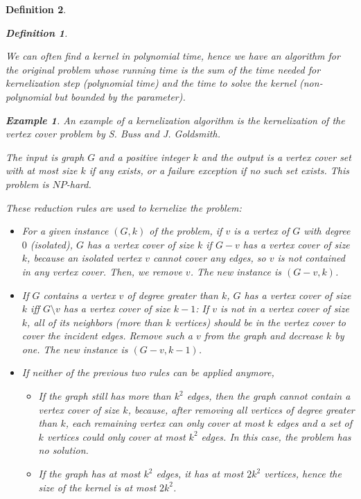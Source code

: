 \documentclass[12pt]{article}
\theoremstyle{slplain}
\newtheorem{defi}{Definition}
\newtheorem{exam}{Example}
\begin{document}
\begin{defi}
\begin{defi}
\end{defi}




We can often find a kernel in polynomial time, hence we have an algorithm for the original problem whose running time is the sum of the time needed for kernelization step (polynomial time) and the time to solve the kernel (non-polynomial but bounded by the parameter).

\vspace{1cm}
\begin{exam}
An example of a kernelization algorithm is the kernelization of
the vertex cover problem by S. Buss and J. Goldsmith\cite{buss}. 

The input is graph $G$ and a positive integer 
$k$ and the output is a vertex cover set with at most size $k$ if any exists, or
a failure exception if no such set exists. This problem is $NP$-hard. 

These reduction rules are used to kernelize the problem:

\begin{itemize}
\item For a given instance $(G,k)$ of the problem, if $v$ is a vertex of $G$ with degree $0$ (isolated), $G$ has a vertex cover of size $k$ if $G-v$ has a vertex cover of size $k$, because an isolated vertex $v$ cannot cover any edges, so $v$ is not contained in any vertex cover. Then, we remove $v$. The new instance is $(G - v , k)$.


\item If $G$ contains a vertex $v$ of degree greater than $k$, $G$ has a vertex cover of size $k$ iff $G\setminus v$ has a vertex cover of size $k - 1$: If $v$ is not in a vertex cover of size $k$, all of its neighbors (more than $k$ vertices) should be in the vertex cover to cover the incident edges. Remove such a $v$ from the graph and decrease $k$ by one. The new instance is $(G - v , k - 1)$.

\item If neither of the previous two rules can be applied anymore,
\begin{itemize}
\item If the graph still has more than $k^2$ edges, then the graph cannot contain a vertex cover of size $k$, because, after  removing all vertices of degree greater than 
$k$, each remaining vertex can only cover at most $k$ edges and a set of
$k$ vertices could only cover at most $k^2$ edges. In this case, the problem has no solution.

\item If the graph has at most $k^2$ edges, it has at most $2 k^2$ vertices, hence the size of the kernel is at most $2 k^2$.
\end{itemize}


\end{itemize}
\end{exam}
\end{defi}
\end{document}
